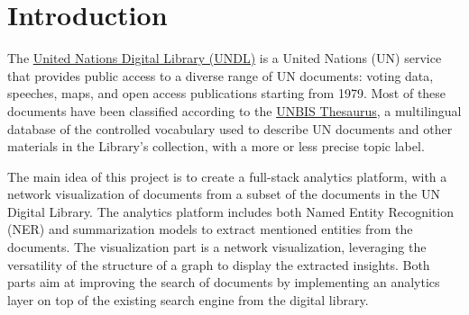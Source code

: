 
\section{Introduction} \label{sec:introduction}

The \href{https://digitallibrary.un.org/}{United Nations Digital Library (UNDL)} is a United Nations (UN) service that provides public access to a diverse range of UN documents: voting data, speeches, maps, and open access publications starting from 1979.
Most of these documents have been classified according to the \href{https://metadata.un.org/thesaurus/about?lang=en}{UNBIS Thesaurus}, a multilingual database of the controlled vocabulary used to describe UN documents and other materials in the Library's collection, with a more or less precise topic label.


The main idea of this project is to create a full-stack analytics platform, with a network visualization of documents from a subset of the documents in the UN Digital Library. The analytics platform includes both Named Entity Recognition (NER) and summarization models to extract mentioned entities from the documents. The visualization part is a network visualization, leveraging the versatility of the structure of a graph to display the extracted insights. Both parts aim at improving the search of documents by implementing an analytics layer on top of the existing search engine from the digital library.
